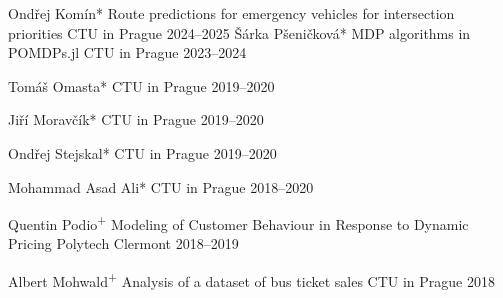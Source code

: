 \vspace{-0.8cm}
\begin{cvhonors}
  \cvhonor
    {Ondřej Komín*} %
    {Route predictions for emergency vehicles for intersection priorities} %
    {CTU in Prague} %
    {2024--2025} %
  \cvhonor
    {Šárka Pšeničková*} %
    {MDP algorithms in POMDPs.jl} %
    {CTU in Prague} %
    {2023--2024} %

  \cvhonor
    {Tomáš Omasta*} %
    {} %
    {CTU in Prague} %
    {2019--2020} %

  \cvhonor
    {Jiří Moravčík*} %
    {} %
    {CTU in Prague} %
    {2019--2020} %

  \cvhonor
    {Ondřej Stejskal*} %
    {} %
    {CTU in Prague} %
    {2019--2020} %

  \cvhonor
    {Mohammad Asad Ali*} %
    {} %
    {CTU in Prague} %
    {2018--2020} %

  \cvhonor
    {Quentin Podio\textsuperscript{+}} %
    {Modeling of Customer Behaviour in Response to Dynamic Pricing} %
    {\hspace{-3em}Polytech Clermont} %
    {2018--2019} %

  \cvhonor
    {Albert Mohwald\textsuperscript{+}} %
    {Analysis of a dataset of bus ticket sales} %
    {CTU in Prague} %
    {2018} %

\end{cvhonors}
